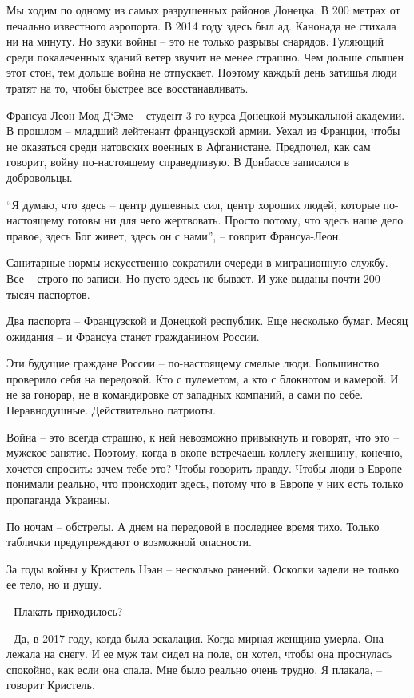 Мы ходим по одному из самых разрушенных районов Донецка. В 200 метрах от
печально известного аэропорта. В 2014 году здесь был ад. Канонада не стихала ни
на минуту. Но звуки войны – это не только разрывы снарядов. Гуляющий среди
покалеченных зданий ветер звучит не менее страшно. Чем дольше слышен этот стон,
тем дольше война не отпускает. Поэтому каждый день затишья люди тратят на то,
чтобы быстрее все восстанавливать.

Франсуа-Леон Мод Д`Эме – студент 3-го курса Донецкой музыкальной академии. В
прошлом – младший лейтенант французской армии. Уехал из Франции, чтобы не
оказаться среди натовских военных в Афганистане. Предпочел, как сам говорит,
войну по-настоящему справедливую. В Донбассе записался в добровольцы.

\enquote{Я думаю, что здесь – центр душевных сил, центр хороших людей, которые
по-настоящему готовы ни для чего жертвовать. Просто потому, что здесь наше дело
правое, здесь Бог живет, здесь он с нами}, – говорит Франсуа-Леон.

Санитарные нормы искусственно сократили очереди в миграционную службу. Все –
строго по записи. Но пусто здесь не бывает. И уже выданы почти 200 тысяч
паспортов.

Два паспорта – Французской и Донецкой республик. Еще несколько бумаг. Месяц
ожидания – и Франсуа станет гражданином России.

Эти будущие граждане России – по-настоящему смелые люди. Большинство проверило
себя на передовой. Кто с пулеметом, а кто с блокнотом и камерой. И не за
гонорар, не в командировке от западных компаний, а сами по себе. Неравнодушные.
Действительно патриоты.

Война – это всегда страшно, к ней невозможно привыкнуть и говорят, что это –
мужское занятие. Поэтому, когда в окопе встречаешь коллегу-женщину, конечно,
хочется спросить: зачем тебе это? Чтобы говорить правду. Чтобы люди в Европе
понимали реально, что происходит здесь, потому что в Европе у них есть только
пропаганда Украины.

По ночам – обстрелы. А днем на передовой в последнее время тихо. Только
таблички предупреждают о возможной опасности.

За годы войны у Кристель Нэан – несколько ранений. Осколки задели не только ее
тело, но и душу.

- Плакать приходилось?

- Да, в 2017 году, когда была эскалация. Когда мирная женщина умерла. Она
лежала на снегу. И ее муж там сидел на поле, он хотел, чтобы она проснулась
спокойно, как если она спала. Мне было реально очень трудно. Я плакала, –
говорит Кристель.


